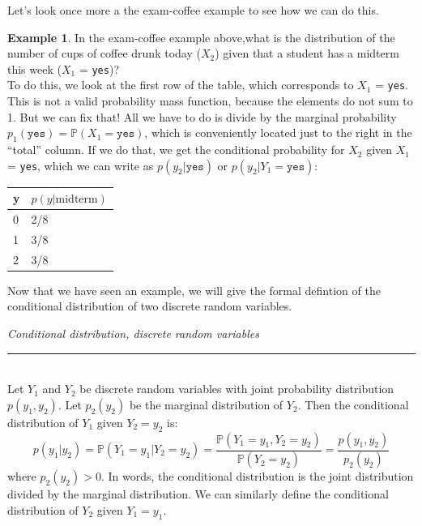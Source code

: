 \documentclass[12pt]{article}
\theoremstyle{definition}
\newtheorem*{example}{Example}
\theoremstyle{remark}
\def\P{{\mathbb P}}
\begin{document}
Let's look once more a the exam-coffee example to see how we can do this.

\begin{example}
In the exam-coffee example above,what is the distribution of the number of cups of coffee drunk today ($X_2$) given that a student has a midterm this week ($X_1$ = \texttt{yes})?\\

To do this, we look at the first row of the table, which corresponds to $X_1$ = \texttt{yes}. This is not a valid probability mass function, because the elements do not sum to 1. But we can fix that! All we have to do is divide by the marginal probability $p_1(\texttt{yes}) = \P(X_1 = \texttt{yes})$, which is conveniently located just to the right in the ``total'' column. If we do that, we get the conditional probability for $X_2$ given $X_1$ = \texttt{yes}, which we can write as $p(y_2 | \texttt{yes})$ or $p(y_2 | Y_1 = \texttt{yes})$:

\begin{table}[H]
\centering
\begin{tabular}{@{}ll@{}}
\toprule
y & $p(y | \text{midterm})$ \\ \midrule
0 & 2/8                                  \\
1 & 3/8                                  \\
2 & 3/8                                \\ \bottomrule
\end{tabular}
\end{table}
\end{example}

Now that we have seen an example, we will give the formal defintion of the conditional distribution of two discrete random variables.

\begin{framed}
\emph{Conditional distribution, discrete random variables}\\
  \rule{\dimexpr{}\fboxrule}{.1pt} \\
Let $Y_1$ and $Y_2$ be discrete random variables with joint probability distribution $p(y_1, y_2)$. Let $p_2(y_2)$ be the marginal distribution of $Y_2$. Then the conditional distribution of $Y_1$ given $Y_2 = y_2$ is:
\[
p(y_1|y_2) = \P(Y_1 = y_1|Y_2 = y_2) = \frac{\P(Y_1 = y_1, Y_2 = y_2)}{\P(Y_2 = y_2)} = \frac{p(y_1, y_2)}{p_2(y_2)}
\]
where $p_2(y_2) > 0$. In words, the conditional distribution is the joint distribution divided by the marginal distribution. We can similarly define the conditional distribution of $Y_2$ given $Y_1 = y_1$.
\end{framed}
\end{document}
